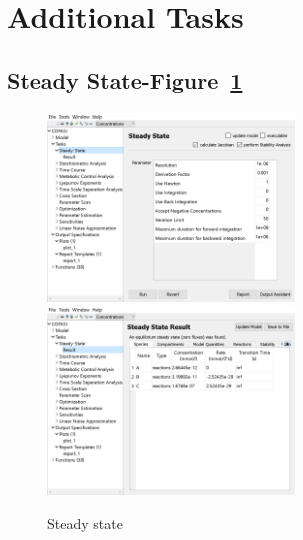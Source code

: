 \documentclass[10pt]{article}
\theoremstyle{definition}
\theoremstyle{remark}
\begin{document}
	\section*{Additional Tasks}
	\subsection*{Steady State-Figure~\ref{12png}}
	\begin{figure}[!htb]
		\centering
		\includegraphics[height=5cm]{Images/12a.png}
		\includegraphics[height=5cm]{Images/12b.png}
		\caption{Steady state}
		\label{12png}
	\end{figure}
	
\end{document}
